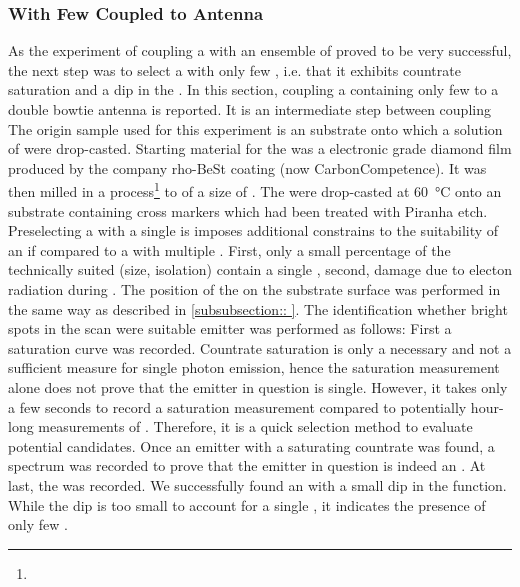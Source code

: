 		\subsubsection{\Nd With Few \siv Coupled to Antenna}\label{subsubsection::antenna_single_siv}

			As the experiment of coupling a \nd with an ensemble of \sivs proved to be very successful, the next step was to select a \nd with only few \sivs, i.e. that it exhibits countrate saturation and a dip in the \gtf.
			In this section, coupling a \nd containing only few \sivs to a double bowtie antenna is reported.
			It is an intermediate step between coupling
			The origin sample used for this experiment is an \ir substrate onto which a solution of \nds were drop-casted.
			Starting material for the \nds was a electronic grade diamond film produced by the company rho-BeSt coating (now CarbonCompetence).
			It was then milled in a \basd process\footnote{\krueger} to \nds of a size of .
			The \nds were drop-casted at \SI{60}{\celsius} onto an \ir substrate containing cross markers which had been treated with Piranha etch.
			\\
			Preselecting a \nd with a single \siv is imposes additional constrains to the suitability of an \nd if compared to a \nd with multiple \sivs.
			First, only a small percentage of the technically suited \nds (size, isolation) contain a single \siv, second, damage due to electon radiation during \pp.
			The position of the \sivs on the substrate surface was performed in the same way as described in \autoref{subsubsection::
			}.
			The identification whether bright spots in the scan were suitable emitter was performed as follows:
			First a saturation curve was recorded.
			Countrate saturation is only a necessary and not a sufficient measure for single photon emission, hence the saturation measurement alone does not prove that the emitter in question is single.
			However, it takes only a few seconds to record a saturation measurement compared to potentially hour-long measurements of \gtfs.
			Therefore, it is a quick selection method to evaluate potential candidates.
			Once an emitter with a saturating countrate was found, a spectrum was recorded to prove that the emitter in question is indeed an \siv.
			At last, the \gtf was recorded.
			We successfully found an \siv with a small dip in the \gt function.
			While the dip is too small to account for a single \siv, it indicates the presence of only few \sivs.

